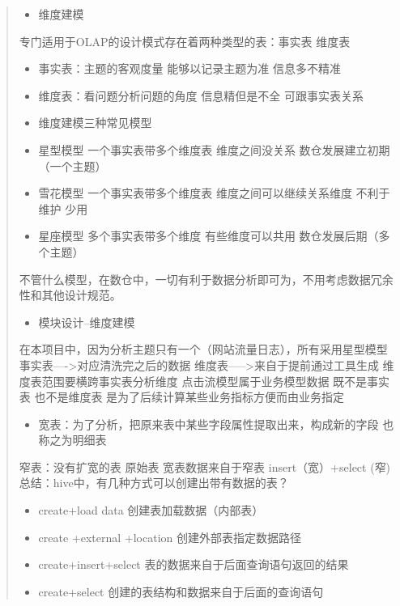 \begin{quote}
\begin{itemize}
\item
  维度建模
\end{itemize}

专门适用于OLAP的设计模式存在着两种类型的表：事实表 维度表

\begin{itemize}
\item
  事实表：主题的客观度量 能够以记录主题为准 信息多不精准
\item
  维度表：看问题分析问题的角度 信息精但是不全 可跟事实表关系
\item
  维度建模三种常见模型
\item
  星型模型 一个事实表带多个维度表 维度之间没关系
  数仓发展建立初期（一个主题）
\item
  雪花模型 一个事实表带多个维度表 维度之间可以继续关系维度 不利于维护
  少用
\item
  星座模型 多个事实表带多个维度 有些维度可以共用
  数仓发展后期（多个主题）
\end{itemize}

不管什么模型，在数仓中，一切有利于数据分析即可为，不用考虑数据冗余性和其他设计规范。

\begin{itemize}
\item
  模块设计--维度建模
\end{itemize}

在本项目中，因为分析主题只有一个（网站流量日志），所有采用星型模型
事实表----\textgreater{}对应清洗完之后的数据
维度表-----\textgreater{}来自于提前通过工具生成
维度表范围要横跨事实表分析维度 点击流模型属于业务模型数据 既不是事实表
也不是维度表 是为了后续计算某些业务指标方便而由业务指定

\begin{itemize}
\item
  宽表：为了分析，把原来表中某些字段属性提取出来，构成新的字段
  也称之为明细表
\end{itemize}

窄表：没有扩宽的表 原始表 宽表数据来自于窄表 insert（宽）+select (窄)
总结：hive中，有几种方式可以创建出带有数据的表？

\begin{itemize}
\item
  create+load data 创建表加载数据（内部表）
\item
  create +external +location 创建外部表指定数据路径
\item
  create+insert+select 表的数据来自于后面查询语句返回的结果
\item
  create+select 创建的表结构和数据来自于后面的查询语句


\end{itemize}
\end{quote}
